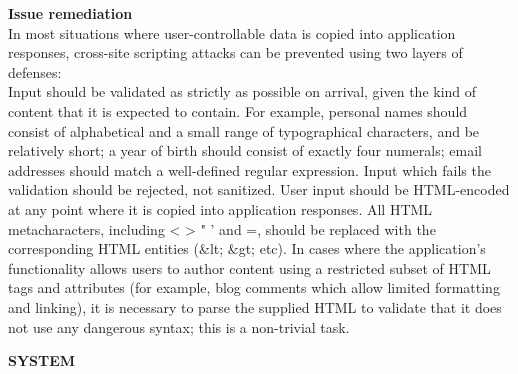 \begin{itemize}
\textbf{Issue remediation} \\
In most situations where user-controllable data is copied into application responses, cross-site scripting attacks can be prevented using two layers of defenses: \\

Input should be validated as strictly as possible on arrival, given the kind of content that it is expected to contain. For example, personal names should consist of alphabetical and a small range of typographical characters, and be relatively short; a year of birth should consist of exactly four numerals; email addresses should match a well-defined regular expression. Input which fails the validation should be rejected, not sanitized.
User input should be HTML-encoded at any point where it is copied into application responses. All HTML metacharacters, including < > " ' and =, should be replaced with the corresponding HTML entities (\&lt; \&gt; etc).
In cases where the application's functionality allows users to author content using a restricted subset of HTML tags and attributes (for example, blog comments which allow limited formatting and linking), it is necessary to parse the supplied HTML to validate that it does not use any dangerous syntax; this is a non-trivial task.

\end{itemize}

\begin{center}
\textbf{SYSTEM}
\end{center}

